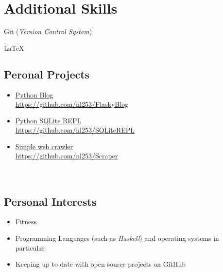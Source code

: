 \documentclass[a4paper, 13pt, draft]{article}
\begin{document}
\section*{\color{col1} Additional Skills \color{default}}

\begin{itemize}
    \begin{multicols}{2}
    \item Git (\textit{Version Control System})
    \item \LaTeX
    \end{multicols}
\end{itemize}

\begin{multicols}{2}

    \subsection*{Peronal Projects}

    \begin{itemize}
	\item \href{https://github.com/nl253/FlaskyBlog}{Python Blog \\ https://github.com/nl253/FlaskyBlog}
	\item \href{https://github.com/nl253/SQLiteREPL}{Python SQLite REPL  \\ https://github.com/nl253/SQLiteREPL}
	\item \href{https://github.com/nl253/Scraper}{Simple web crawler \\ https://github.com/nl253/Scraper}\\ \\ \\
    \end{itemize}

    \subsection*{Personal Interests}

    \begin{itemize}
	\item Fitness
	\item Programming Languages (such as \textit{Haskell}) and operating systems in particular
	\item Keeping up to date with open source projects on GitHub \\ \\ \\
    \end{itemize} 

\end{multicols}
\end{document}
